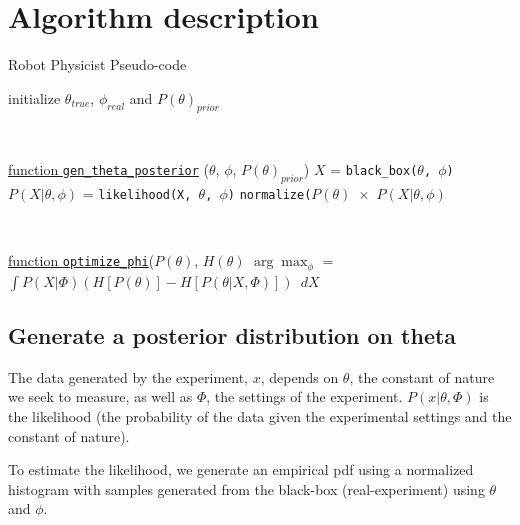 \documentclass[10pt,journal,compsoc]{IEEEtran}
\begin{document}








\section{Algorithm description}
\begin{algorithm}[h!]
\caption{\label{algo} Robot Physicist Pseudo-code}
 initialize $\theta_{true}$, $\phi_{real}$ and $P(\theta)_{prior}$\;

\

    \underline{function \texttt{gen\_theta\_posterior}} ($\theta$, $\phi$, $P(\theta)_{prior}$)\;
    $X$ = \texttt{black\_box($\theta$, $\phi$)}\;
    $P(X | \theta, \phi) $ = \texttt{likelihood(X, $\theta$, $\phi$)}\;
    \Return \texttt{normalize($P(\theta)$ $\times$ $P(X | \theta, \phi) $}\;

\

	\underline{function \texttt{optimize\_phi}}($P(\theta)$, $H(\theta)$\;
    \Return $\arg\max_\phi$ = $\int P(X|\Phi) (H[P(\theta)]-H[P(\theta|X,\Phi)])$ $\, dX$
\end{algorithm}


\subsection{Generate a posterior distribution on theta}

The data generated by the experiment, $x$, depends on $\theta$, the constant of nature we seek to measure, as well as $\Phi$, the settings of the experiment. $P(x|\theta,\Phi)$ is the likelihood (the probability of the data given the experimental settings and the constant of nature).

To estimate the likelihood, we generate an empirical pdf using a normalized histogram with samples generated from the black-box (real-experiment) using $\theta$ and $\phi$.
\end{document}
